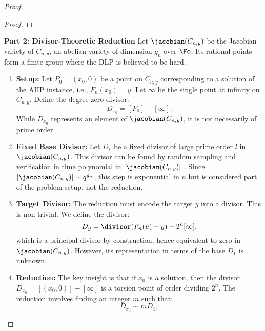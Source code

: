 \begin{proof}
\begin{proof}
                \end{proof}
            \textbf{Part 2: Divisor-Theoretic Reduction}
                Let \(\jacobian(C_{n,y})\) be the Jacobian variety of \(C_{n,y}\), an abelian variety of dimension \(g_n\) over \(\Fq\). Its rational points form a finite group where the DLP is believed to be hard.
                \begin{enumerate}
                    \item \textbf{Setup:} Let \(P_0 = (x_0, 0)\) be a point on \(C_{n,y}\) corresponding to a solution of the AIIP instance, i.e., \(F_n(x_0) = y\). Let \(\infty\) be the single point at infinity on \(C_{n,y}\). Define the degree-zero divisor:
                        \begin{equation}
                            D_{x_0} = [P_0] - [\infty].
                        \end{equation}
                        While \(D_{x_0}\) represents an element of \(\jacobian(C_{n,y})\), it is not necessarily of prime order.
                    \item \textbf{Fixed Base Divisor:} Let \(D_1\) be a fixed divisor of large prime order \(l\) in \(\jacobian(C_{n,y})\). This divisor can be found by random sampling and verification in time polynomial in \(|\jacobian(C_{n,y})|\) \cite[Algorithm 7.4]{Gaudry2009}. Since \(|\jacobian(C_{n,y})| \sim q^{g_n}\), this step is exponential in \(n\) but is considered part of the problem setup, not the reduction.
                    \item \textbf{Target Divisor:} The reduction must encode the target \(y\) into a divisor. This is non-trivial. We define the divisor:
                        \begin{equation}
                            D_y = \divisor(F_n(u) - y) - 2^n[\infty],
                        \end{equation}
                        which is a principal divisor by construction, hence equivalent to zero in \(\jacobian(C_{n,y})\). However, its representation in terms of the base \(D_1\) is unknown.
                    \item \textbf{Reduction:} The key insight is that if \(x_0\) is a solution, then the divisor \(D_{x_0} = [(x_0,0)] - [\infty]\) is a torsion point of order dividing \(2^n\). The reduction involves finding an integer \(m\) such that:
                        \begin{equation}\label{eq:dlp-relation}
                            D_{x_0} \sim m D_1,
                        \end{equation}

\end{enumerate}
\end{proof}
